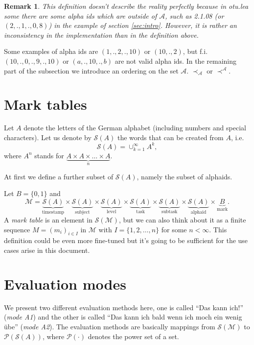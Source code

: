 \documentclass{scrartcl}
\newtheorem{remark}{Remark}
\begin{document}
\begin{remark}
This definition doesn't describe the reality perfectly because in otu.lea some there are some alpha ids which are outside of $\mathcal{A}$, such as 2.1.08 (or $(2,.,1,.,0,8)$) in the example of section \ref{sec:intro}. However, it is rather an inconsistency in the implementation than in the definition above.
\end{remark}

Some examples of alpha ids are $(1,.,2,.,10)$ or $(10,.,2)$, but f.i. $(10,.,0,.,9,.,10)$ or $(a,.,10,.,b)$ are not valid alpha ids. In the remaining part of the subsection we introduce an ordering on the set $\mathcal{A}$. $\prec_{\mathcal{A}}$ or $\prec^{\mathcal{A}}$.


\section{Mark tables}
Let $A$ denote the letters of the German alphabet (including numbers and special characters). Let us denote by $\mathcal{S}(A)$ the words that can be created from $A$, i.e.
$$\mathcal{S}(A)=\cup_{k=1}^{\infty}A^k,$$
where $A^n$ stands for $\underbrace{A\times A\times\ldots \times A}_{n}$. 

At first we define a further subset of $\mathcal{S}(A)$, namely the subset of alphaids.

Let $B=\{0,1\}$ and $$\mathcal{M}=\underbrace{\mathcal{S}(A)}_{\mbox{timestamp}}\times\underbrace{\mathcal{S}(A)}_{\mbox{subject}}\times\underbrace{\mathcal{S}(A)}_{\mbox{level}}\times\underbrace{\mathcal{S}(A)}_{\mbox{task}}\times\underbrace{\mathcal{S}(A)}_{\mbox{subtask}}\times\underbrace{\mathcal{S}(A)}_{\mbox{alphaid}}\times \underbrace{B}_{\mbox{mark}}.$$ A \emph{mark table} is an element in $\mathcal{S}(\mathcal{M})$, but we can also think about it as a finite sequence $M=(m_i)_{i\in I}$ in $\mathcal{M}$ with $I=\{1,2,\ldots,n\}$ for some $n<\infty$. This definition could be even more fine-tuned but it's going to be sufficient for the use cases arise in this document.

\section{Evaluation modes}
We present two different evaluation methods here, one is called ``Das kann ich!'' (\emph{mode A1}) and the other is called ``Das kann ich bald wenn ich moch ein wenig übe'' (\emph{mode A2}). The evaluation methods are basically mappings from $\mathcal{S}({\mathcal{M}})$ to $\mathcal{P}({\mathcal{S}(A)})$, where $\mathcal{P}(\cdot)$ denotes the power set of a set.
\end{document}
